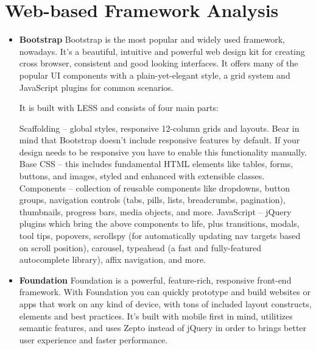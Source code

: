 \section{Web-based Framework Analysis}
 \begin{itemize}
\item \textbf{Bootstrap}
\newline
Bootstrap is the most popular and widely used framework, nowadays. It’s a beautiful, intuitive and powerful web design kit for creating cross browser, consistent and good looking interfaces. It offers many of the popular UI components with a plain-yet-elegant style, a grid system and JavaScript plugins for common scenarios.

It is built with LESS and consists of four main parts:

Scaffolding – global styles, responsive 12-column grids and layouts. Bear in mind that Bootstrap doesn’t include responsive features by default. If your design needs to be responsive you have to enable this functionality manually.
Base CSS – this includes fundamental HTML elements like tables, forms, buttons, and images, styled and enhanced with extensible classes.
Components – collection of reusable components like dropdowns, button groups, navigation controls (tabs, pills, lists, breadcrumbs, pagination), thumbnails, progress bars, media objects, and more.
JavaScript – jQuery plugins which bring the above components to life, plus transitions, modals, tool tips, popovers, scrollspy (for automatically updating nav targets based on scroll position), carousel, typeahead (a fast and fully-featured autocomplete library), affix navigation, and more.
\item \textbf{Foundation}
\newline
Foundation is a powerful, feature-rich, responsive front-end framework. With Foundation you can quickly prototype and build websites or apps that work on any kind of device, with tons of included layout constructs, elements and best practices. It’s built with mobile first in mind, utilitizes semantic features, and uses Zepto instead of jQuery in order to brings better user experience and faster performance.


\end{itemize}
